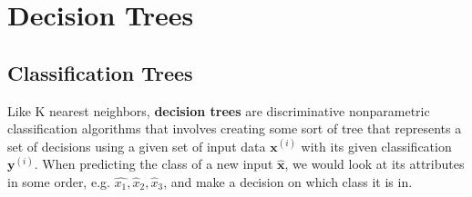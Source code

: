 \section{Decision Trees} 

\subsection{Classification Trees}

  \begin{definition}
    Like K nearest neighbors, \textbf{decision trees} are discriminative nonparametric classification algorithms that involves creating some sort of tree that represents a set of decisions using a given set of input data $\mathbf{x}^{(i)}$ with its given classification $\mathbf{y}^{(i)}$. When predicting the class of a new input $\hat{\mathbf{x}}$, we would look at its attributes in some order, e.g. $\hat{x_1}, \hat{x}_2, \hat{x}_3$, and make a decision on which class it is in. 


\end{definition}
